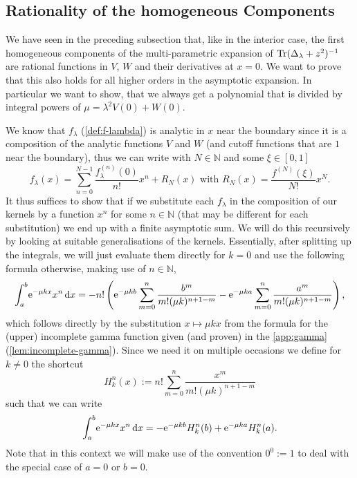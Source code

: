 \subsection{Rationality of the homogeneous Components}
We have seen in the preceding subsection that, like in the interior case, the
first homogeneous components of the multi-parametric expansion of
$\Tr(\Delta_\lambda + z^2)^{-1}$ are rational functions in $V$, $W$ and their
derivatives at $x = 0$. We want to prove that this also holds for all higher
orders in the asymptotic expansion. In particular we want to show, that we
always get a polynomial that is divided by integral powers of $\mu = \lambda^2
V(0) + W(0)$.

We know that $f_\lambda$ (\cref{def:f-lambda}) is analytic in $x$ near the
boundary since it is a composition of the analytic functions $V$ and $W$ (and
cutoff functions that are $1$ near the boundary), thus we can write with
$N\in\mathbb{N}$ and some $\xi\in[0,1]$
\begin{equation}
  \label{eqn:taylor-of-f}
  f_\lambda(x) = \sum_{n=0}^{N-1} \frac{f_\lambda^{(n)}(0)}{n!} x^n + R_N(x)
  \text{ with } R_N(x) = \frac{f^{(N)}(\xi)}{N!} x^{N}.
\end{equation}
It thus suffices to show that if we substitute each $f_\lambda$ in the
composition of our kernels by a function $x^n$ for some $n\in\mathbb{N}$ (that
may be different for each substitution) we end up with a finite asymptotic sum.
We will do this recursively by looking at suitable generalisations of the
kernels. Essentially, after splitting up the integrals, we will just evaluate
them directly for $k=0$ and use the following formula otherwise, making use of
$n\in\mathbb{N}$,
\begin{equation}
  \Integ[b]{a}{x}{\Eto{-\mu kx}x^n}
    = -n!\left(\Eto{-\mu kb}\sum_{m=0}^n \frac{b^m}{m!(\mu k)^{n+1-m}} -
              \Eto{-\mu ka}\sum_{m=0}^n \frac{a^m}{m!(\mu k)^{n+1-m}}\right),
\end{equation}
which follows directly by the substitution $x \mapsto \mu kx$ from the formula
for the (upper) incomplete gamma function given (and proven) in the
\cref{app:gamma} (\cref{lem:incomplete-gamma}). Since we need it on multiple
occasions we define for $k\ne 0$ the shortcut
\begin{equation}
  \label{def:h-n-k}
  H^n_k(x) := n!\sum_{m=0}^n \frac{x^m}{m!(\mu k)^{n+1-m}}
\end{equation}
such that we can write
\begin{equation}
  \label{eqn:ex-integ}
  \Integ[b]{a}{x}{\Eto{-\mu kx}x^n} = -\Eto{-\mu kb}H^n_k(b) + \Eto{-\mu
  ka}H^n_k(a).
\end{equation}
Note that in this context we will make use of the convention $0^0 := 1$ to
deal with the special case of $a = 0$ or $b = 0$.


